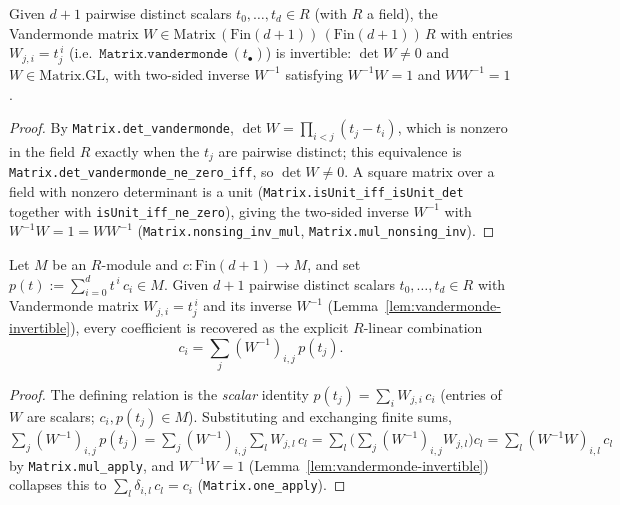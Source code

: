 \begin{lemma}
    \label{lem:vandermonde-invertible}
    Given $d+1$ pairwise distinct scalars $t_0, \ldots, t_d \in R$ (with $R$ a field), the Vandermonde
    matrix $W \in \mathrm{Matrix}\,(\mathrm{Fin}(d+1))\,(\mathrm{Fin}(d+1))\,R$ with entries
    $W_{j,i} = t_j^{\,i}$ (i.e.\ $\texttt{Matrix.vandermonde}\,(t_\bullet)$) is invertible: $\det W \ne 0$
    and $W \in \mathrm{Matrix}.\mathrm{GL}$, with two-sided inverse $W^{-1}$ satisfying
    $W^{-1} W = 1$ and $W W^{-1} = 1$.
\end{lemma}
\begin{proof}
    By \texttt{Matrix.det\_vandermonde}, $\det W = \prod_{i<j}(t_j - t_i)$, which is nonzero in the field
    $R$ exactly when the $t_j$ are pairwise distinct; this equivalence is
    \texttt{Matrix.det\_vandermonde\_ne\_zero\_iff}, so $\det W \ne 0$. A square matrix over a field with
    nonzero determinant is a unit (\texttt{Matrix.isUnit\_iff\_isUnit\_det} together with
    \texttt{isUnit\_iff\_ne\_zero}), giving the two-sided inverse $W^{-1}$ with $W^{-1} W = 1 = W W^{-1}$
    (\texttt{Matrix.nonsing\_inv\_mul}, \texttt{Matrix.mul\_nonsing\_inv}).
\end{proof}

\begin{lemma}
    \label{lem:poly-coeff-vandermonde-recovery}
    Let $M$ be an $R$-module and $c : \mathrm{Fin}(d+1) \to M$, and set
    $p(t) := \sum_{i=0}^{d} t^{\,i}\, c_i \in M$. Given $d+1$ pairwise distinct scalars
    $t_0, \ldots, t_d \in R$ with Vandermonde matrix $W_{j,i} = t_j^{\,i}$ and its inverse $W^{-1}$
    (Lemma~\ref{lem:vandermonde-invertible}), every coefficient is recovered as the explicit $R$-linear
    combination
    \[
        c_i = \sum_{j} (W^{-1})_{i,j}\, p(t_j).
    \]
\end{lemma}
\begin{proof}
    The defining relation is the \emph{scalar} identity $p(t_j) = \sum_i W_{j,i}\, c_i$ (entries of $W$ are
    scalars; $c_i, p(t_j) \in M$). Substituting and exchanging finite sums,
    $\sum_j (W^{-1})_{i,j}\, p(t_j) = \sum_j (W^{-1})_{i,j} \sum_l W_{j,l}\, c_l
      = \sum_l \bigl(\sum_j (W^{-1})_{i,j} W_{j,l}\bigr) c_l = \sum_l (W^{-1} W)_{i,l}\, c_l$ by
    \texttt{Matrix.mul\_apply}, and $W^{-1} W = 1$ (Lemma~\ref{lem:vandermonde-invertible}) collapses this to
    $\sum_l \delta_{i,l}\, c_l = c_i$ (\texttt{Matrix.one\_apply}).
\end{proof}

